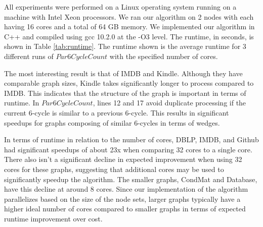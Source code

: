 \documentclass[11pt]{article}
\begin{document}
\begin{table}[h]
  \caption{Runtime (seconds)}
  \label{tab:runtime}
  \centering
\end{table}

All experiments were performed on a Linux operating system running on a machine with Intel Xeon processors.
We ran our algorithm on 2 nodes with each having 16 cores and a total of 64 GB memory.
We implemented our algorithm in C++ and compiled using gcc 10.2.0 at the -O3 level.
The runtime, in seconds, is shown in Table \ref{tab:runtime}.
The runtime shown is the average runtime for 3 different runs of $Par6CycleCount$ with the specified number of cores.

The most interesting result is that of IMDB and Kindle.
Although they have comparable graph sizes, Kindle takes significantly longer to process compared to IMDB.
This indicates that the structure of the graph is important in terms of runtime.
In $Par6CycleCount$, lines 12 and 17 avoid duplicate processing if the current 6-cycle is similar to a previous 6-cycle.
This results in significant speedups for graphs composing of similar 6-cycles in terms of wedges.

In terms of runtime in relation to the number of cores, DBLP, IMDB, and Github had significant speedups of about 23x when comparing 32 cores to a single core.
There also isn't a significant decline in expected improvement when using 32 cores for these graphs, suggesting that additional cores may be used to significantly speedup the algorithm.
The smaller graphs, CondMat and Database, have this decline at around 8 cores.
Since our implementation of the algorithm parallelizes based on the size of the node sets, larger graphs typically have a higher ideal number of cores compared to smaller graphs in terms of expected runtime improvement over cost.
\end{document}
